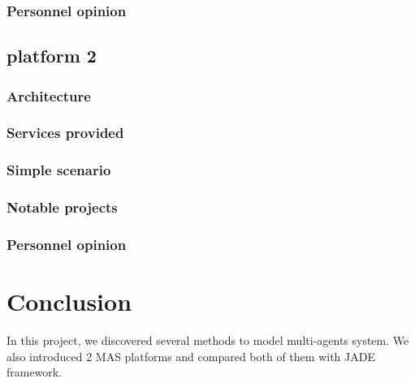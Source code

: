 \documentclass[a4paper,11pt]{report}
\begin{document}
  \subsubsection{Personnel opinion}
  
  \clearpage %
  
  \subsection{platform 2} %
  
  \subsubsection{Architecture}
  
  \subsubsection{Services provided}
  
  \subsubsection{Simple scenario}
  
  \subsubsection{Notable projects}
  
  \subsubsection{Personnel opinion}
  
  
  
  
  \section{Conclusion}
  In this project, we discovered several methods to model multi-agents system. We also 
  introduced 2 MAS platforms and compared both of them with JADE framework.

  
%
%
\end{document}
